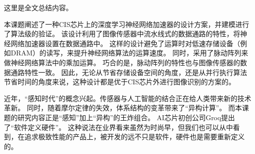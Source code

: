 
\begin{summary}
这里是全文总结内容。

本课题阐述了一种CIS芯片上的深度学习神经网络加速器的设计方案，并建模进行了算法级的验证。
该设计利用了图像传感器中流水线式的数据通路的特性，将神经网络加速器设置在数据通路中。
这样的设计避免了运算时对低速存储设备（例如DRAM）的读写，来提升神经网络算法的运算速度。
同时，采用了脉动阵列来做神经网络算法中的乘加运算。
巧合的是，脉动阵列的特性也与图像传感器的数据通路特性一致。  
因此，无论从节省存储设备空间的角度，还是从并行执行算法节省时间的角度来说，这种设计都是优于CIS芯片外进行图像识别的方案的。  

近年，“感知时代”的概念兴起。传感器与人工智能的结合正在给人类带来新的技术革新。
同时，随着摩尔定律的失效，体系结构的变革带来了“异构计算”。
而本课题的研究内容正是“感知”加上“异构”的王炸组合。
AI芯片初创公司Groq提出了“软件定义硬件”。
这种说法在业界看来虽然为时尚早，但我们也可以从中看到，在追求极致性能的产品上，被开发的远不只是软件，硬件也是需要重新定义的。


\end{summary}
